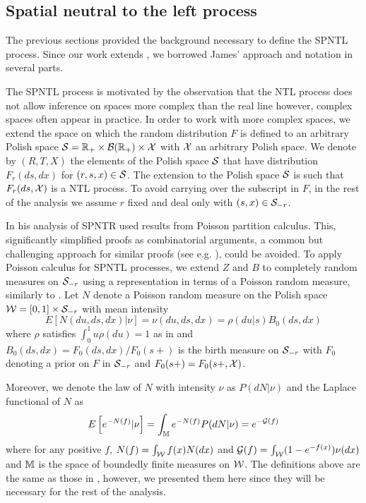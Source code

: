 \subsection{Spatial neutral to the left process}\label{SPNTL_process}
The previous sections provided the background necessary to define the SPNTL process. Since our work extends \cite{james2006poisson}, we borrowed James' approach and notation in several parts. 

The SPNTL process is motivated by the observation that the NTL process does not allow inference on spaces more complex than the real line however, complex spaces often appear in practice. In order to work with more complex spaces, we extend the space on which the random distribution $F$ is defined to an arbitrary Polish space $\mathcal{S} = \mathbb{R}_{+} \times \mathcal{B}(\mathbb{R}_{+}) \times \mathcal{X}$ with $\mathcal{X}$ an arbitrary Polish space. We denote by $(R, T, X)$ the elements of the Polish space $\mathcal{S}$ that have distribution $F_r(ds, dx)$ for $(r, s, x) \in \cal{S}$. The extension to the Polish space $\mathcal{S}$ is such that $F_r(ds, \mathcal{X})$ is a NTL process. To avoid carrying over the subscript in $F$, in the rest of the analysis we assume $r$ fixed and deal only with $(s, x) \in \mathcal{S}_{-r}$.

In his analysis of SPNTR \cite{james2006poisson} used results from Poisson partition calculus. This, significantly simplified proofs as combinatorial arguments, a common but challenging approach for similar proofs (see e.g. \cite{antoniak1974mixtures,pitman2002combinatorial}), could be avoided. To apply Poisson calculus for SPNTL processes, we extend $Z$ and $B$ to completely random measures on $\mathcal{S}_{-r}$ using a representation in terms of a Poisson random measure, similarly to \cite{james2006poisson}. Let $N$ denote a Poisson random measure on the Polish space $\mathcal{W} = [0,1] \times \mathcal{S}_{-r}$ with mean intensity 
\begin{equation*}
E[N(du, ds, dx) | \nu] = \nu(du, ds, dx) = \rho(du | s)B_0(ds, dx)
\end{equation*}
where $\rho$ satisfies $\int_0^1 u \rho(du) = 1$ as in \cite{james2006poisson} and $B_0(ds, dx) = F_0(ds, dx)/F_0(s+)$ is the birth measure on $\mathcal{S}_{-r}$ with $F_0$ denoting a prior on $F$ in $\mathcal{S}_{-r}$ and $F_0(s+) = F_0(s+, \mathcal{X})$.

Moreover, we denote the law of $N$ with intensity $\nu$ as $P(dN|\nu)$ and the Laplace functional of $N$ as
\begin{equation*}
E\left[e^{-N(f)}|\nu\right] = \int_{\mathbb{M}} e^{-N(f)}P(dN|\nu) = e^{-\mathcal{G}(f)}
\end{equation*}
where for any positive $f$, $N(f) = \int_{\mathcal{W}} f(x)N(dx)$ and $\mathcal{G}(f) =\int_{\mathcal{W}}(1-e^{-f(x)})\nu(dx)$ and $\mathbb{M}$ is the space of boundedly finite measures on $\cal{W}$. The definitions above are the same as those in \cite{james2006poisson}, however, we presented them here since they will be necessary for the rest of the analysis.

